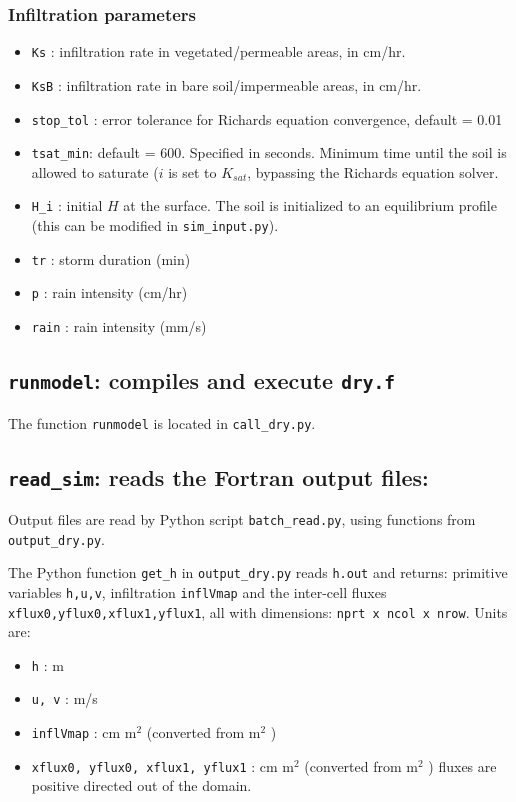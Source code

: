 \documentclass{article}
\newcommand{\code}[1]{\texttt{#1}}
\begin{document}
\subsubsection*{Infiltration parameters}
\begin{itemize}
	\item \code{Ks} : infiltration rate in vegetated/permeable areas, in cm/hr.  
	\item \code{KsB} : infiltration rate in bare soil/impermeable areas, in cm/hr.
	
	\item \code{stop\_tol} : error tolerance for Richards equation convergence,	default = 0.01

	\item \code{tsat\_min}: default = 600.  Specified in seconds.  Minimum time until the soil is allowed to saturate ($i$ is set to $K_{sat}$, bypassing the Richards equation solver.
	\item \code{H\_i} : initial $H$ at the surface.  The soil is initialized to an equilibrium profile (this can be modified in \code{sim\_input.py}).
\end{itemize}

\begin{itemize}
	\item \code{tr} : storm duration (min)
	\item \code{p} : rain intensity (cm/hr)
	\item \code{rain} : rain intensity (mm/s)
\end{itemize}


\subsection{\code{runmodel}: compiles and execute \code{dry.f}}

The function \code{runmodel} is located in \code{call\_dry.py}.  

\subsection{\code{read\_sim}: reads the Fortran output files: }

Output files are read by Python script \code{batch\_read.py}, using functions from \code{output\_dry.py}. 

The Python function \code{get\_h} in \code{output\_dry.py} reads \code{h.out} and returns:
primitive variables \code{h,u,v}, infiltration  \code{inflVmap} and the inter-cell fluxes \code{xflux0,yflux0,xflux1,yflux1}, all with dimensions: \code{nprt x ncol x nrow}.  
Units are:
\begin{itemize}
	\item \code{h} : m
	\item \code{u, v} : m/s
	\item \code{inflVmap} : cm m$^2$ (converted from m$^2$ )
	\item \code{xflux0, yflux0, xflux1, yflux1} : cm m$^2$ (converted from m$^2$ )
	       \subitem fluxes are positive directed out of the domain.
\end{itemize}
\end{document}
